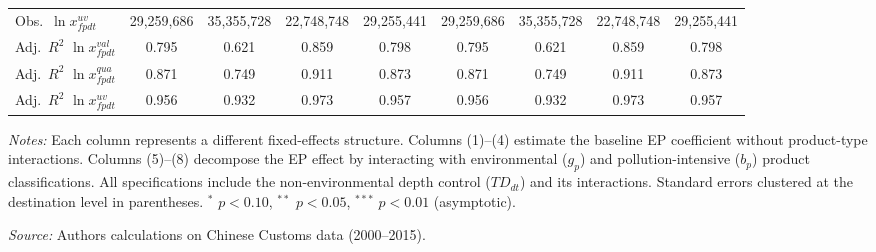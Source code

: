 \begin{table}[htbp]
\begin{threeparttable}
\begin{tabular}{lcccccccc}
Obs.\ $\ln x^{uv}_{fpdt}$ & 29,259,686 & 35,355,728 & 22,748,748 & 29,255,441 & 29,259,686 & 35,355,728 & 22,748,748 & 29,255,441 \\
Adj.\ $R^2$ $\ln x^{val}_{fpdt}$ & 0.795 & 0.621 & 0.859 & 0.798 & 0.795 & 0.621 & 0.859 & 0.798 \\
Adj.\ $R^2$ $\ln x^{qua}_{fpdt}$ & 0.871 & 0.749 & 0.911 & 0.873 & 0.871 & 0.749 & 0.911 & 0.873 \\
Adj.\ $R^2$ $\ln x^{uv}_{fpdt}$ & 0.956 & 0.932 & 0.973 & 0.957 & 0.956 & 0.932 & 0.973 & 0.957 \\
\bottomrule
\end{tabular}
\begin{tablenotes}[flushleft]\footnotesize
\item \textit{Notes:} Each column represents a different fixed-effects structure. Columns (1)--(4) estimate the baseline EP coefficient without product-type interactions. Columns (5)--(8) decompose the EP effect by interacting with environmental ($g_p$) and pollution-intensive ($b_p$) product classifications. All specifications include the non-environmental depth control ($TD_{dt}$) and its interactions. Standard errors clustered at the destination level in parentheses. $^{*}$ $p<0.10$, $^{**}$ $p<0.05$, $^{***}$ $p<0.01$ (asymptotic).
\item \textit{Source:} Authors\textquotesingle{} calculations on Chinese Customs data (2000--2015).
\end{tablenotes}
\end{threeparttable}
\end{table}
